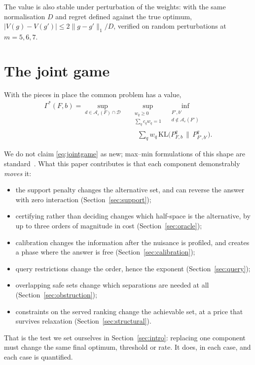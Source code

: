 The value is also stable under perturbation of the weights: with the same normalisation
$D$ and regret defined against the true optimum,
$|V(g)-V(g')|\le2\|g-g'\|_{1}/D$, verified on random perturbations at $m=5,6,7$. \NUM{}

\section{The joint game}
\label{sec:joint}

With the pieces in place the common problem has a value,
\begin{equation}
\begin{aligned}
\Gamma^{*}(F,b)=\sup_{d\in\mathcal{A}_{\varepsilon}(F)\cap\mathcal{D}}\ \,
&\sup_{\substack{w_{q}\ge0\\ \sum_{q}c_{q}w_{q}=1}}\ \,
\inf_{\substack{F',b'\\ d\notin\mathcal{A}_{\varepsilon}(F')}}\\[-2pt]
&\quad\sum_{q}w_{q}\,\mathrm{KL}\bigl(P^{q}_{F,b}\,\|\,P^{q}_{F',b'}\bigr).
\end{aligned}
\label{eq:jointgame}
\end{equation}

We do not claim \eqref{eq:jointgame} as new; max--min formulations of this shape are
standard~\cite{degenne2019,nitinawarat2013}. What this paper contributes is that each
component demonstrably \emph{moves} it:
\begin{itemize}
\item the support penalty changes the alternative set, and can reverse the answer with zero
interaction (Section~\ref{sec:support});
\item certifying rather than deciding changes which half-space is the
alternative, by up to three orders of magnitude in cost (Section~\ref{sec:oracle});
\item calibration changes the information after the nuisance is profiled, and creates a
phase where the answer is free (Section~\ref{sec:calibration});
\item query restrictions change the order, hence the exponent (Section~\ref{sec:query});
\item overlapping safe sets change which separations are needed at all
(Section~\ref{sec:obstruction});
\item constraints on the served ranking change the achievable set, at a price that survives
relaxation (Section~\ref{sec:structural}).
\end{itemize}
That is the test we set ourselves in Section~\ref{sec:intro}: replacing one component must
change the same final optimum, threshold or rate. It does, in each case, and each case is
quantified.

